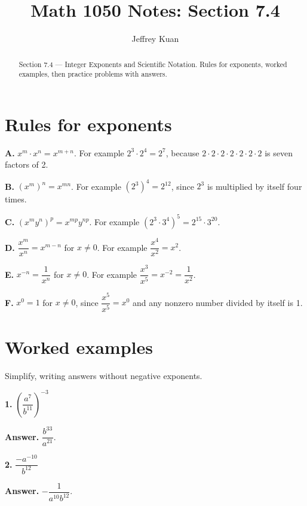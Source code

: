 \documentclass{ximera}
\author{Jeffrey Kuan}
\title{Math 1050 Notes: Section 7.4}
\begin{document}
\begin{abstract}
    Section 7.4 --- Integer Exponents and Scientific Notation.
    Rules for exponents, worked examples, then practice problems with answers.
\end{abstract}

\maketitle

\section*{Rules for exponents}

\textbf{A.} $x^{m}\cdot x^{n}=x^{m+n}$. For example $2^{3}\cdot 2^{4}=2^{7}$, because
$2\cdot 2\cdot 2\cdot 2\cdot 2\cdot 2\cdot 2$ is seven factors of 2.

\textbf{B.} $\left(x^{m}\right)^{n}=x^{mn}$. For example
$\left(2^{3}\right)^{4}=2^{12}$, since $2^{3}$ is multiplied by itself four times.

\textbf{C.} $\left(x^{m}y^{n}\right)^{p}=x^{mp}y^{np}$. For example
$\left(2^{3}\cdot 3^{4}\right)^{5}=2^{15}\cdot 3^{20}$.

\textbf{D.} $\dfrac{x^{m}}{x^{n}}=x^{m-n}$ for $x \neq 0$. For example
$\dfrac{x^{4}}{x^{2}}=x^{2}$.

\textbf{E.} $x^{-n}=\dfrac{1}{x^{n}}$ for $x \neq 0$. For example
$\dfrac{x^{3}}{x^{5}}=x^{-2}=\dfrac{1}{x^{2}}$.

\textbf{F.} $x^{0}=1$ for $x \neq 0$, since $\dfrac{x^{5}}{x^{5}}=x^{0}$ and any nonzero
number divided by itself is 1.

\section*{Worked examples}

Simplify, writing answers without negative exponents.

\begin{problem}

\textbf{1.} $\left(\dfrac{a^{7}}{b^{11}}\right)^{-3}$

\begin{hint}
\textbf{Answer.} $\dfrac{b^{33}}{a^{21}}$.
\end{hint}
\end{problem}

\begin{problem}

\textbf{2.} $\dfrac{-a^{-10}}{b^{12}}$

\begin{hint}
\textbf{Answer.} $-\dfrac{1}{a^{10}b^{12}}$.
\end{hint}
\end{problem}
\end{document}
